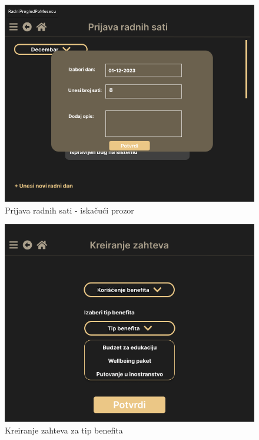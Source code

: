 \documentclass[a4paper]{article}
\begin{document}
\begin{figure} [!ht]
    \begin{center}
        \includegraphics[scale=0.25]{UI/Zaposleni/RadniSatiPopup.png}
    \end{center}
\caption{Prijava radnih sati - iskačući prozor}
\end{figure}

\begin{figure} [!ht]
    \begin{center}
        \includegraphics[scale=0.25]{UI/Zaposleni/TipBenefita.png}
    \end{center}
\caption{Kreiranje zahteva za tip benefita}
\end{figure}
\end{document}
